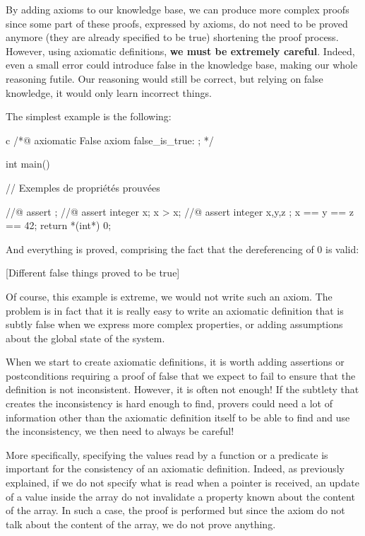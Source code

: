 

By adding axioms to our knowledge base, we can produce more complex
proofs since some part of these proofs, expressed by axioms, do not need
to be proved anymore (they are already specified to be true) shortening
the proof process. However, using axiomatic definitions, \textbf{we must
be extremely careful}. Indeed, even a small error could introduce false
in the knowledge base, making our whole reasoning futile. Our reasoning
would still be correct, but relying on false knowledge, it would only
learn incorrect things.



The simplest example is the following:



\begin{CodeBlock}{c}
/*@
  axiomatic False{
    axiom false_is_true: \false;
  }
*/

int main(){
  // Exemples de propriétés prouvées

  //@ assert \false;
  //@ assert \forall integer x; x > x;
  //@ assert \forall integer x,y,z ; x == y == z == 42;
  return *(int*) 0;
}
\end{CodeBlock}



And everything is proved, comprising the fact that the dereferencing of
0 is valid:



[Different false things proved to be true]


Of course, this example is extreme, we would not write such an axiom.
The problem is in fact that it is really easy to write an axiomatic
definition that is subtly false when we express more complex properties,
or adding assumptions about the global state of the system.




When we start to create axiomatic definitions, it is worth adding
assertions or postconditions requiring a proof of false that we expect
to fail to ensure that the definition is not inconsistent. However, it
is often not enough! If the subtlety that creates the inconsistency is
hard enough to find, provers could need a lot of information other than
the axiomatic definition itself to be able to find and use the
inconsistency, we then need to always be careful!




More specifically, specifying the values read by a function or a
predicate is important for the consistency of an axiomatic definition.
Indeed, as previously explained, if we do not specify what is read when
a pointer is received, an update of a value inside the array do not
invalidate a property known about the content of the array. In such a
case, the proof is performed but since the axiom do not talk about the
content of the array, we do not prove anything.




